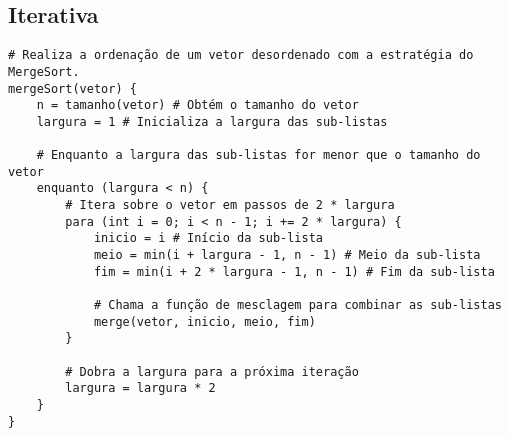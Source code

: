 \subsection{Iterativa}
\begin{verbatim}
# Realiza a ordenação de um vetor desordenado com a estratégia do MergeSort.
mergeSort(vetor) {
    n = tamanho(vetor) # Obtém o tamanho do vetor
    largura = 1 # Inicializa a largura das sub-listas

    # Enquanto a largura das sub-listas for menor que o tamanho do vetor
    enquanto (largura < n) {
        # Itera sobre o vetor em passos de 2 * largura
        para (int i = 0; i < n - 1; i += 2 * largura) {
            inicio = i # Início da sub-lista
            meio = min(i + largura - 1, n - 1) # Meio da sub-lista
            fim = min(i + 2 * largura - 1, n - 1) # Fim da sub-lista

            # Chama a função de mesclagem para combinar as sub-listas
            merge(vetor, inicio, meio, fim)
        }

        # Dobra a largura para a próxima iteração
        largura = largura * 2
    }
}

\end{verbatim}
